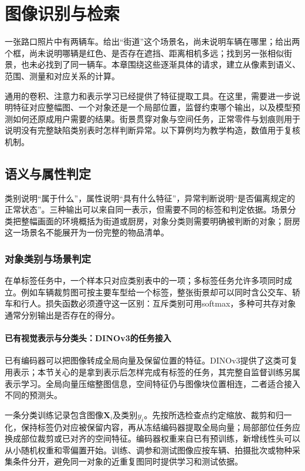 \chapter{图像识别与检索}
\label{chap:vision-image-recognition}

一张路口照片中有两辆车。给出“街道”这个场景名，尚未说明车辆在哪里；给出两个框，尚未说明哪辆是红色、是否存在遮挡、距离相机多远；找到另一张相似街景，也未必找到了同一辆车。本章围绕这些逐渐具体的请求，建立从像素到语义、范围、测量和对应关系的计算。

通用的卷积、注意力和表示学习已经提供了特征提取工具。在这里，需要进一步说明特征对应整幅图、一个对象还是一个局部位置，监督约束哪个输出，以及模型预测如何还原成用户需要的结果。街景贯穿对象与空间任务，正常零件与划痕则用于说明没有完整缺陷类别表时怎样判断异常。以下算例均为教学构造，数值用于复核机制。

\section{语义与属性判定}
\label{sec:vision-recognition-semantics}

类别说明“属于什么”，属性说明“具有什么特征”，异常判断说明“是否偏离规定的正常状态”。三种输出可以来自同一表示，但需要不同的标签和判定依据。场景分类把整幅画面的环境概括为街道或厨房，对象分类则需要明确被判断的对象；厨房这一场景名不能展开为一份完整的物品清单。

\subsection{对象类别与场景判定}
\label{sec:vision-recognition-classification}

在单标签任务中，一个样本只对应类别表中的一项；多标签任务允许多项同时成立。例如车辆裁剪图可按主要车型给一个标签，整张街景却可以同时含公交车、轿车和行人。损失函数必须遵守这一区别：互斥类别可用softmax，多种可共存对象通常分别输出是否存在的得分。

\subsubsection{已有视觉表示与分类头：DINOv3的任务接入}
\label{sec:vision-recognition-dinov3}

已有编码器可以把图像转成全局向量及保留位置的特征。DINOv3提供了这类可复用表示；本节关心的是拿到表示后怎样完成有标签的任务，其完整自监督训练另属表示学习。全局向量压缩整图信息，空间特征仍与图像块位置相连，二者适合接入不同的预测头。

一条分类训练记录包含图像$\bm{X}_i$及类别$y_i$。先按所选检查点约定缩放、裁剪和归一化，保持标签仍对应被保留内容，再从冻结编码器提取全局向量；局部部位任务应换成部位裁剪或已对齐的空间特征。编码器权重来自已有预训练，新增线性头可以从小随机权重和零偏置开始。训练、调参和测试图像应按车辆、拍摄批次或物种采集条件分开，避免同一对象的近重复图同时提供学习和测试依据。

